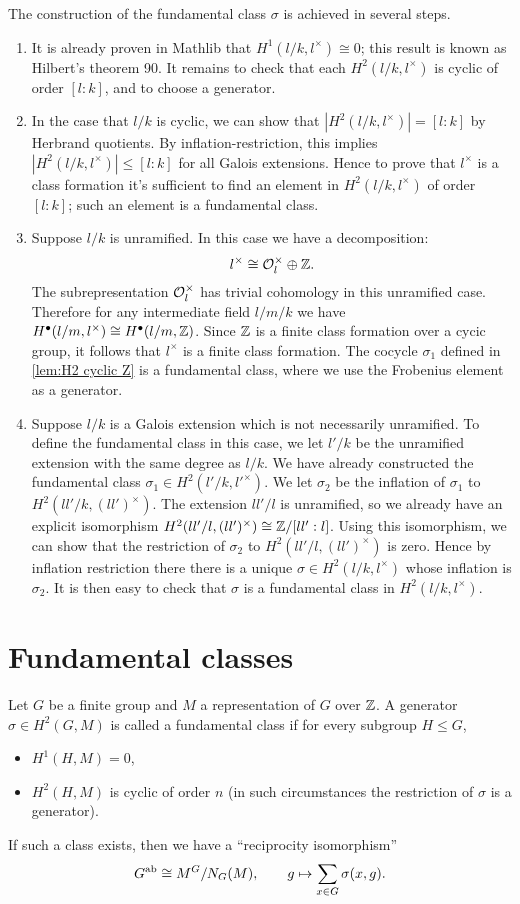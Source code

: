 The construction of the fundamental class $\sigma$ is achieved in several steps.
\begin{enumerate}
	\item
	It is already proven in Mathlib that $H^1(l/k,l^\times) \cong 0$;
	this result is known as Hilbert's theorem 90.
	It remains to check that each $H^2(l/k,l^\times)$ is cyclic of order $[l:k]$, and to
	choose a generator.
	\item
	In the case that $l/k$ is cyclic, we can show that $|H^2(l/k,l^\times)| = [l:k]$ by
	Herbrand quotients. By inflation-restriction, this implies $|H^2(l/k,l^\times)| \le [l:k]$
	for all Galois extensions. Hence to prove that $l^\times$ is a class formation it's sufficient to
	find an element in $H^2(l/k,l^\times)$ of order $[l:k]$; such an element is a fundamental class.
	\item
	Suppose $l/k$ is unramified. In this case we have a decomposition:
	\[
		l ^\times \cong {\mathcal O}_l^\times \oplus {\mathbb Z}.
	\]
	The subrepresentation ${\mathcal O}_l^\times$ has trivial cohomology in this unramified case.
	Therefore for any intermediate field $l/m/k$ we have
	$H^\bullet(l/m,l^\times) \cong H^\bullet(l/m,{\mathbb Z})$.
	Since ${\mathbb Z}$ is a finite class formation over a cycic group, it follows that $l^\times$ is a
	finite class formation.
	The cocycle $\sigma_1$ defined in \ref{lem:H2 cyclic Z} is a fundamental class,
	where we use the Frobenius element as a generator.
	\item
	Suppose $l/k$ is a Galois extension which is not necessarily unramified. To define the
	fundamental class in this case, we let $l'/k$ be the unramified extension with the same degree as
	$l/k$. We have already constructed the fundamental class $\sigma_1 \in H^2(l'/k, l'^\times)$.
	We let $\sigma_2$ be the inflation of $\sigma_1$ to $H^2(ll'/k, (ll')^\times)$.
	The extension $ll' / l$ is unramified, so we already have an explicit isomorphism
	$H^2(ll'/l, (ll')^\times) \cong {\mathbb Z} / [ll':l]$.
	Using this isomorphism, we can show that the restriction of $\sigma_2$
	to $H^2(ll'/l, (ll')^\times)$ is zero.
	Hence by inflation restriction there there is a unique $\sigma \in H^2(l/k, l^\times)$ whose
	inflation is $\sigma_2$.
	It is then easy to check that $\sigma$ is a fundamental class in $H^2(l/k,l^\times)$.
\end{enumerate}




\section{Fundamental classes}
Let $G$ be a finite group and $M$ a representation of $G$ over ${\mathbb Z}$.
A generator $\sigma \in H^2(G,M)$ is called a fundamental class if for every subgroup $H \le G$,
\begin{itemize}
	\item
	$H^1(H,M) = 0$,
	\item
	$H^2(H,M)$ is cyclic of order $n$
	(in such circumstances the restriction of $\sigma$ is a generator).
\end{itemize}
If such a class exists, then we have a ``reciprocity isomorphism''
\[
	G^{\mathrm{ab}} \cong M^G / N_G(M), \qquad
	g \mapsto \sum_{x \in G} \sigma(x,g).
\]

